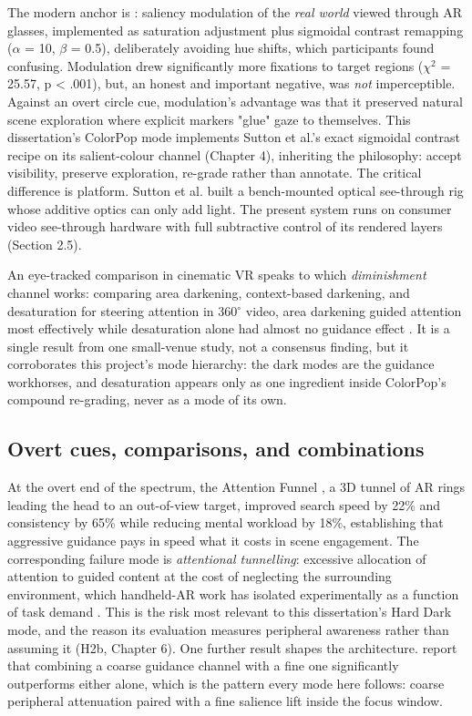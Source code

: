 The modern anchor is \citet{sutton2022}: saliency
modulation of the \textit{real world} viewed through AR glasses, implemented as saturation adjustment plus
sigmoidal contrast remapping ($\alpha$ = 10, $\beta$ = 0.5), deliberately avoiding hue shifts, which participants
found confusing. Modulation drew significantly more fixations to target regions ($\chi^2$ = 25.57,
p < .001), but, an honest and important negative, was \textit{not} imperceptible. Against an overt circle
cue, modulation's advantage was that it preserved natural scene exploration where explicit markers
"glue" gaze to themselves. This dissertation's ColorPop mode implements Sutton et al.'s exact
sigmoidal contrast recipe on its salient-colour channel (Chapter 4), inheriting the philosophy:
accept visibility, preserve exploration, re-grade rather than annotate. The critical difference is
platform. Sutton et al. built a bench-mounted optical see-through rig whose additive optics can only
add light. The present system runs on consumer video see-through hardware with full subtractive
control of its rendered layers (Section 2.5).

An eye-tracked comparison in cinematic VR speaks to which \textit{diminishment} channel works: comparing
area darkening, context-based darkening, and desaturation for steering attention in 360$^{\circ}$ video, area
darkening guided attention most effectively while desaturation alone had almost no guidance effect
\citep{wang2020}. It is a single result from one small-venue study, not a consensus finding,
but it corroborates this project's mode hierarchy: the dark modes are the guidance workhorses, and
desaturation appears only as one ingredient inside ColorPop's compound re-grading, never as a mode of
its own.

\subsection{Overt cues, comparisons, and combinations}

At the overt end of the spectrum, the Attention Funnel \citep{biocca2006}, a 3D
tunnel of AR rings leading the head to an out-of-view target, improved search speed by 22\% and
consistency by 65\% while reducing mental workload by 18\%, establishing that aggressive guidance
pays in speed what it costs in scene engagement. The corresponding failure mode is \textit{attentional
tunnelling}: excessive allocation of attention to guided content at the cost of neglecting the
surrounding environment, which handheld-AR work has isolated experimentally as a function of task
demand \citep{syiem2021}. This is the risk most relevant to this dissertation's Hard Dark mode,
and the reason its evaluation measures peripheral awareness rather than assuming it (H2b, Chapter 6).
One further result shapes the architecture. \citet{hein2019} report that
combining a coarse guidance channel with a fine one significantly outperforms either alone, which is
the pattern every mode here follows: coarse peripheral attenuation paired with a fine salience lift
inside the focus window.

